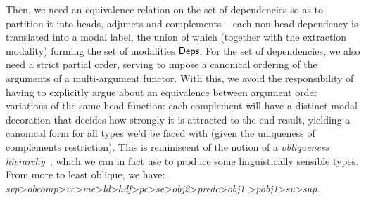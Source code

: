 Then, we need an equivalence relation on the set of dependencies so as to partition it into heads, adjuncts and complements -- each non-head dependency is translated into a modal label, the union of which (together with the extraction modality) forming the set of modalities $\mathsf{Deps}$.
For the set of dependencies, we also need a strict partial order, serving to impose a canonical ordering of the arguments of a multi-argument functor.
With this, we avoid the responsibility of having to explicitly argue about an equivalence between argument order variations of the same head function: each complement will have a distinct modal decoration that decides how strongly it is attracted to the end result, yielding a canonical form for all types we'd be faced with (given the uniqueness of complements restriction).
This is reminiscent of the notion of a \textit{obliqueness hierarchy}~\cite{dowty1982grammatical}, which we can in fact use to produce some linguistically sensible types.
From more to least oblique, we have: \textit{svp}\textgreater\textit{obcomp}\textgreater\textit{vc}\textgreater\textit{me}\textgreater\textit{ld}\textgreater\textit{hdf}\textgreater\textit{pc}\textgreater\textit{se}\textgreater\textit{obj2}\textgreater\textit{predc}\textgreater\textit{obj1} \textgreater\textit{pobj1}\textgreater\textit{su}\textgreater\textit{sup}.


